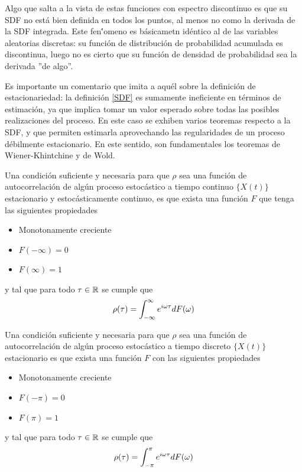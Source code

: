 Algo que salta a la vista de estas funciones con espectro discontinuo es que su SDF no est\'a
bien definida en todos los puntos, al menos no como la derivada de la SDF integrada.
Este fen\''omeno es b\'asicametn id\'entico al de las variables aleatorias discretas:
su funci\'on
de distribuci\'on de probabilidad acumulada es discontinua, luego no es cierto que su
funci\'on de densidad de probabilidad sea la derivada ''de algo''.


Es importante un comentario que imita a aqu\'el sobre la definici\'on de estacionariedad:
la definici\'on \ref{SDF} es sumamente ineficiente en t\'erminos de estimaci\'on, ya que implica
tomar un valor esperado sobre todas las posibles realizaciones del proceso.
En este caso se exhiben varios teoremas respecto a la SDF, y que permiten estimarla aprovechando
las regularidades de un proceso d\'ebilmente estacionario. 
En este sentido, son fundamentales los teoremas de Wiener-Khintchine y de Wold.

\begin{thrm}
Una condici\'on suficiente y necesaria para que $\rho$ sea una funci\'on de autocorrelaci\'on de 
alg\'un proceso estoc\'astico a tiempo continuo $\{X(t)\}$ estacionario y estoc\'asticamente 
continuo, es que exista una funci\'on $F$ que tenga las 
siguientes propiedades
\begin{itemize}
\item Monotonamente creciente
\item $F(-\infty) = 0$
\item $F(\infty) = 1$
\end{itemize}
y tal que para todo $\tau \in \mathbb{R}$ se cumple que
\begin{equation*}
\rho(\tau) = \int_{-\infty}^{\infty} e^{i \omega \tau} dF(\omega)
\end{equation*}
\end{thrm}

\begin{thrm}[Wold]
Una condici\'on suficiente y necesaria para que $\rho$ sea una funci\'on de autocorrelaci\'on de 
alg\'un proceso estoc\'astico a tiempo discreto $\{X(t)\}$ estacionario
es que exista una funci\'on $F$ con las 
siguientes propiedades
\begin{itemize}
\item Monotonamente creciente
\item $F(-\pi) = 0$
\item $F(\pi) = 1$
\end{itemize}
y tal que para todo $\tau \in \mathbb{R}$ se cumple que
\begin{equation*}
\rho(\tau) = \int_{-\pi}^{\pi} e^{i \omega \tau} dF(\omega)
\end{equation*}
\end{thrm}

